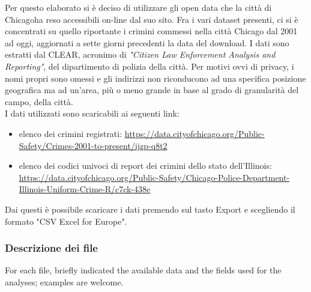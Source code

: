 \documentclass[10pt]{article}
\begin{document}
Per questo elaborato si è deciso di utilizzare gli open data che la città di Chicagoha reso accessibili on-line dal suo sito. 
Fra i vari dataset presenti, ci si è concentrati su quello riportante i crimini commessi nella città Chicago dal 2001 ad oggi, aggiornati 
a sette giorni precedenti la data del download. I dati sono estratti dal CLEAR, acronimo di \textit{"Citizen Law Enforcement Analysis and Reporting"}, del dipartimento di polizia della città. Per motivi ovvi di privacy, i nomi propri sono omessi e gli indirizzi non riconducono 
ad una specifica posizione geografica ma ad un'area, più o meno grande in base al grado di granularità del campo, della città. \\
I dati utilizzati sono scaricabili ai seguenti link:
\begin{itemize}
\item elenco dei crimini registrati: \url{https://data.cityofchicago.org/Public-Safety/Crimes-2001-to-present/ijzp-q8t2}
\item elenco dei codici univoci di report dei crimini dello stato dell'Illinois: \url{https://data.cityofchicago.org/Public-Safety/Chicago-Police-Department-Illinois-Uniform-Crime-R/c7ck-438e} 
\end{itemize}
Dai questi è possibile scaricare i dati premendo sul tasto Export e scegliendo il formato "CSV Excel for Europe".
 
\subsubsection{Descrizione dei file}

For each file, briefly indicated the available data and the fields used for the analyses; examples are welcome.
\end{document}
